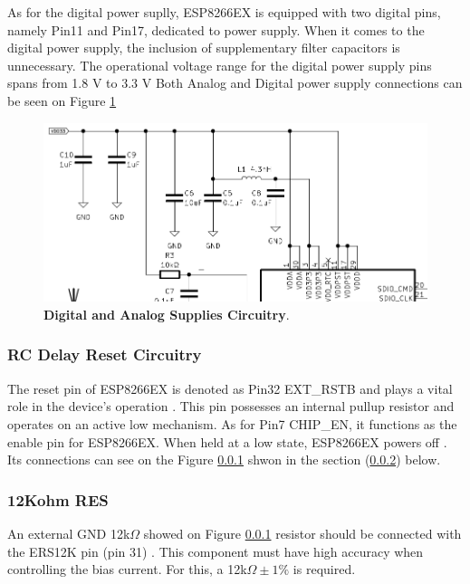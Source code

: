 As for the digital power suplly, ESP8266EX is equipped with two digital pins, namely Pin11 and Pin17, 
dedicated to power supply. When it comes to the digital power supply, the inclusion of supplementary filter capacitors 
is unnecessary. The operational voltage range for the digital power supply pins spans from 1.8 V to 3.3 V \cite{ESP8266HGL}
Both Analog and Digital power supply connections can be seen on Figure \ref{02fig:analogAndDigitalSupplies1}

\begin{figure}[H]
    \centering
    \includegraphics[scale = 0.775]{imagens/analogAndDigitalSupplies.png}
    \caption{\textbf{Digital and Analog Supplies Circuitry}.}
    \label{02fig:analogAndDigitalSupplies1}
\end{figure}



\subsubsection{RC Delay Reset Circuitry}\label{02SubSub:RCDelayResetCircuitry}


The reset pin of ESP8266EX is denoted as Pin32 EXT\_RSTB and plays a vital role in the device's 
operation \cite{ESP8266HGL}. This pin possesses an internal pullup resistor and operates on an active low mechanism. 
As for Pin7 CHIP\_EN, it functions as the enable pin for ESP8266EX. When held at a low state, ESP8266EX powers 
off \cite{ESP8266HGL}. Its connections can see on the Figure \ref{02SubSub:RCDelayResetCircuitry}
shwon in the section (\ref{02SubSub:12kOhmRes}) below.


\subsubsection{12Kohm RES}\label{02SubSub:12kOhmRes}

An external GND 12k$\Omega$ showed on Figure \ref{02SubSub:RCDelayResetCircuitry} resistor should be connected with the ERS12K pin 
(pin 31) \cite{ESP8266HGL}. This component must have high accuracy when controlling the bias current. For this,
a 12k$\Omega \pm 1\%$ is required.


